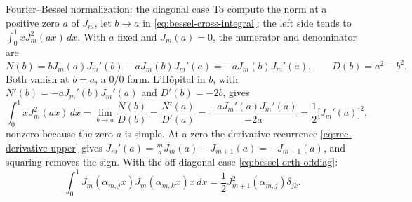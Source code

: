 \documentclass[11pt]{beamer}
\begin{document}
\begin{frame}[allowframebreaks=1.00]{Fourier--Bessel normalization: the diagonal case}
\footnotesize
To compute the norm at a positive zero $a$ of $J_m$, let $b\to a$ in
\eqref{eq:bessel-cross-integral}; the left side tends to $\int_0^1xJ_m^2(ax)\,dx$.
With $a$ fixed and $J_m(a)=0$, the numerator and denominator are
\[
  N(b)=bJ_m(a)J_m'(b)-aJ_m(b)J_m'(a)=-aJ_m(b)J_m'(a),\qquad D(b)=a^2-b^2.
\]
Both vanish at $b=a$, a $0/0$ form. L'H\^opital in $b$, with
$N'(b)=-aJ_m'(b)J_m'(a)$ and $D'(b)=-2b$, gives
\begin{equation}
  \int_0^1xJ_m^2(ax)\,dx=\lim_{b\to a}\frac{N(b)}{D(b)}
  =\frac{N'(a)}{D'(a)}
  =\frac{-aJ_m'(a)J_m'(a)}{-2a}
  =\frac12\bigl[J_m'(a)\bigr]^2,
  \label{eq:bessel-norm-prime}
\end{equation}
nonzero because the zero $a$ is simple. At a zero the derivative recurrence
\eqref{eq:rec-derivative-upper} gives $J_m'(a)=\frac{m}{a}J_m(a)-J_{m+1}(a)=-J_{m+1}(a)$,
and squaring removes the sign. With the off-diagonal case \eqref{eq:bessel-orth-offdiag}:
\begin{equation}
  \int_0^1J_m(\alpha_{m,j}x)J_m(\alpha_{m,k}x)x\,dx
  =\frac12J_{m+1}^2(\alpha_{m,j})\delta_{jk}.
  \label{eq:bessel-orth}
\end{equation}
\end{frame}
\end{document}
